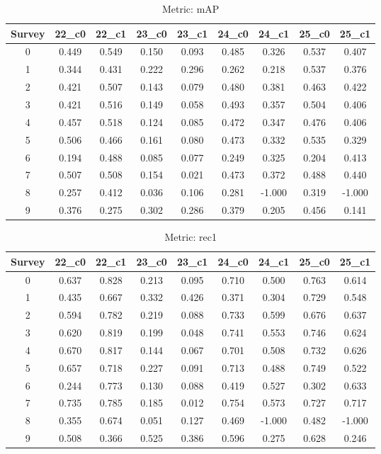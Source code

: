 \documentclass{article}
\begin{document}
\begin{table}[tbh]
\begin{center}
\begin{tabular}{|*{9}{c|}}
\hline
 Survey & 22\_c0 & 22\_c1 & 23\_c0 & 23\_c1 & 24\_c0 & 24\_c1 & 25\_c0 & 25\_c1 \\ 
\hline
0 & 0.449 & 0.549 & 0.150 & 0.093 & 0.485 & 0.326 & 0.537 & 0.407 \\ 
1 & 0.344 & 0.431 & 0.222 & 0.296 & 0.262 & 0.218 & 0.537 & 0.376 \\ 
2 & 0.421 & 0.507 & 0.143 & 0.079 & 0.480 & 0.381 & 0.463 & 0.422 \\ 
3 & 0.421 & 0.516 & 0.149 & 0.058 & 0.493 & 0.357 & 0.504 & 0.406 \\ 
4 & 0.457 & 0.518 & 0.124 & 0.085 & 0.472 & 0.347 & 0.476 & 0.406 \\ 
5 & 0.506 & 0.466 & 0.161 & 0.080 & 0.473 & 0.332 & 0.535 & 0.329 \\ 
6 & 0.194 & 0.488 & 0.085 & 0.077 & 0.249 & 0.325 & 0.204 & 0.413 \\ 
7 & 0.507 & 0.508 & 0.154 & 0.021 & 0.473 & 0.372 & 0.488 & 0.440 \\ 
8 & 0.257 & 0.412 & 0.036 & 0.106 & 0.281 & -1.000 & 0.319 & -1.000 \\ 
9 & 0.376 & 0.275 & 0.302 & 0.286 & 0.379 & 0.205 & 0.456 & 0.141 \\ 
\hline
\end{tabular}
\end{center}
\caption{Metric: mAP}
\end{table}


\begin{table}[tbh]
\begin{center}
\begin{tabular}{|*{9}{c|}}
\hline
 Survey & 22\_c0 & 22\_c1 & 23\_c0 & 23\_c1 & 24\_c0 & 24\_c1 & 25\_c0 & 25\_c1 \\ 
\hline
0 & 0.637 & 0.828 & 0.213 & 0.095 & 0.710 & 0.500 & 0.763 & 0.614 \\ 
1 & 0.435 & 0.667 & 0.332 & 0.426 & 0.371 & 0.304 & 0.729 & 0.548 \\ 
2 & 0.594 & 0.782 & 0.219 & 0.088 & 0.733 & 0.599 & 0.676 & 0.637 \\ 
3 & 0.620 & 0.819 & 0.199 & 0.048 & 0.741 & 0.553 & 0.746 & 0.624 \\ 
4 & 0.670 & 0.817 & 0.144 & 0.067 & 0.701 & 0.508 & 0.732 & 0.626 \\ 
5 & 0.657 & 0.718 & 0.227 & 0.091 & 0.713 & 0.488 & 0.749 & 0.522 \\ 
6 & 0.244 & 0.773 & 0.130 & 0.088 & 0.419 & 0.527 & 0.302 & 0.633 \\ 
7 & 0.735 & 0.785 & 0.185 & 0.012 & 0.754 & 0.573 & 0.727 & 0.717 \\ 
8 & 0.355 & 0.674 & 0.051 & 0.127 & 0.469 & -1.000 & 0.482 & -1.000 \\ 
9 & 0.508 & 0.366 & 0.525 & 0.386 & 0.596 & 0.275 & 0.628 & 0.246 \\ 
\hline
\end{tabular}
\end{center}
\caption{Metric: rec1}
\end{table}
\end{document}
